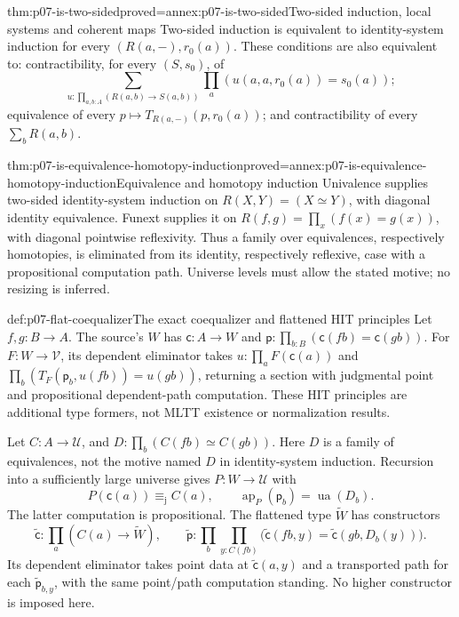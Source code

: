 \begin{hbtheorem}{thm:p07-is-two-sided}{proved=annex:p07-is-two-sided}{Two-sided induction, local systems and coherent maps}
Two-sided induction is equivalent to identity-system induction for every
\((R(a,-),r_0(a))\). These conditions are also equivalent to:
contractibility, for every \((S,s_0)\), of
\[
\sum_{u:\prod_{a,b:A}(R(a,b)\to S(a,b))}
       \prod_a(u(a,a,r_0(a))=s_0(a));
\]
equivalence of every \(p\mapsto T_{R(a,-)}(p,r_0(a))\);
and contractibility of every \(\sum_bR(a,b)\).
\end{hbtheorem}

\begin{hbcorollary}{thm:p07-is-equivalence-homotopy-induction}{proved=annex:p07-is-equivalence-homotopy-induction}{Equivalence and homotopy induction}
Univalence supplies two-sided identity-system induction on
\(R(X,Y)=(X\simeq Y)\), with diagonal identity equivalence.
Funext supplies it on \(R(f,g)=\prod_x(f(x)=g(x))\), with diagonal
pointwise reflexivity. Thus a family over equivalences, respectively
homotopies, is eliminated from its identity, respectively reflexive,
case with a propositional computation path. Universe levels must allow
the stated motive; no resizing is inferred.
\end{hbcorollary}

\begin{hbdefinition}{def:p07-flat-coequalizer}{The exact coequalizer and flattened HIT principles}
Let \(f,g:B\to A\). The source's \(W\) has
\(\mathsf c:A\to W\) and
\(\mathsf p:\prod_{b:B}(\mathsf c(fb)=\mathsf c(gb))\).
For \(F:W\to\mathcal V\), its dependent eliminator takes
\(u:\prod_aF(\mathsf c(a))\) and
\(\prod_b(T_F(\mathsf p_b,u(fb))=u(gb))\), returning a section
with judgmental point and propositional dependent-path computation.
These HIT principles are additional type formers, not MLTT existence
or normalization results.

Let \(C:A\to\mathcal U\), and
\(D:\prod_b(C(fb)\simeq C(gb))\).
Here \(D\) is a family of equivalences, not the motive named \(D\)
in identity-system induction. Recursion into a sufficiently large
universe gives \(P:W\to\mathcal U\) with
\[
P(\mathsf c(a))\equiv_{\mathrm j}C(a),\qquad
\operatorname{ap}_P(\mathsf p_b)=\operatorname{ua}(D_b).
\]
The latter computation is propositional.
The flattened type \(\widetilde W\) has constructors
\[
\widetilde{\mathsf c}:\prod_a(C(a)\to\widetilde W),\qquad
\widetilde{\mathsf p}:\prod_b\prod_{y:C(fb)}
 \bigl(\widetilde{\mathsf c}(fb,y)
       =\widetilde{\mathsf c}(gb,D_b(y))\bigr).
\]
Its dependent eliminator takes point data at
\(\widetilde{\mathsf c}(a,y)\) and a transported path for each
\(\widetilde{\mathsf p}_{b,y}\), with the same point/path
computation standing. No higher constructor is imposed here.
\end{hbdefinition}

